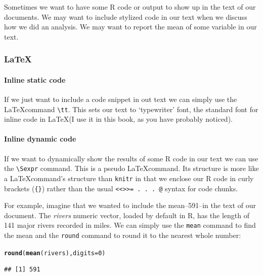 \documentclass[ChapterTOCs,krantz1]{krantz}\usepackage{graphicx, color}
\makeatletter
\newcommand{\hlfunctioncall}[1]{\textcolor[rgb]{0.501960784313725,0,0.329411764705882}{\textbf{#1}}}%
\newenvironment{kframe}{%
 \def\at@end@of@kframe{}%
 \ifinner\ifhmode%
  \def\at@end@of@kframe{\end{minipage}}%
  \begin{minipage}{\columnwidth}%
 \fi\fi%
 \def\FrameCommand##1{\hskip\@totalleftmargin \hskip-\fboxsep
 \colorbox{shadecolor}{##1}\hskip-\fboxsep
     \hskip-\linewidth \hskip-\@totalleftmargin \hskip\columnwidth}%
 \MakeFramed {\advance\hsize-\width
   \@totalleftmargin\z@ \linewidth\hsize
   \@setminipage}}%
 {\par\unskip\endMakeFramed%
 \at@end@of@kframe}
\newenvironment{knitrout}{}{} %
\makeatother
\begin{document}
Sometimes we want to have some R code or output to show up in the text of our documents. We may want to include stylized code in our text when we discuss how we did an analysis. We may want to report the mean of some variable in our text.

\subsubsection{LaTeX}

\paragraph{Inline static code}

If we just want to include a code snippet in out text we can simply use the \LaTeX command  \texttt{\textbackslash{}tt}. This sets our text to `typewriter' font, the standard font for inline code in \LaTeX (I use it in this book, as you have probably noticed).

\paragraph{Inline dynamic code}

If we want to dynamically show the results of some R code in our text we can use the  \texttt{\textbackslash Sexpr} command. This is a pseudo \LaTeX command. Its structure is more like a \LaTeX command's structure than \texttt{knitr} in that we enclose our R code in curly brackets (\texttt{\{\}}) rather than the usual \texttt{\textless\textless\textgreater\textgreater= . . . @} syntax for code chunks.

For example, imagine that we wanted to include the mean--591--in the text of our document. The {\emph{rivers}} numeric vector, loaded by default in R, has the length of 141 major rivers recorded in miles. We can simply use the {\tt{mean}} command to find the mean and the {\tt{round}} command to round it to the nearest whole number:

\begin{knitrout}
\color{fgcolor}\begin{kframe}
\begin{alltt}
\hlfunctioncall{round}(\hlfunctioncall{mean}(rivers), digits = 0)
\end{alltt}
\begin{verbatim}
## [1] 591
\end{verbatim}
\end{kframe}
\end{knitrout}
\end{document}
